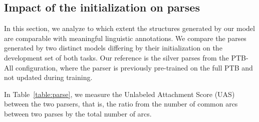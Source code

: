\subsection{Impact of the initialization on parses}
\label{sec:parses-impact}




In this section, we analyze to which extent the structures generated by our model are comparable with meaningful linguistic annotations. We compare the parses generated by two distinct models differing by their initialization on the development set of both tasks. Our reference is the silver parses from the PTB-All configuration, where the parser is previously pre-trained on the full PTB and not updated during training.   


In Table~\ref{table:parse}, we measure the Unlabeled Attachment Score (UAS) between the two parsers, that is, the ratio from the number of common arcs between two parses by the total number of arcs. 

